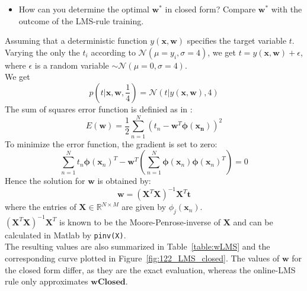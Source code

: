 \documentclass[a4]{article}
\begin{document}
\begin{itemize}
	\item How can you determine the optimal ${\mathbf w}^*$ in closed form? Compare ${\mathbf w}^*$ with the outcome of the LMS-rule training.
\end{itemize}
Assuming that a deterministic function $y(\mathbf{x}, \mathbf{w})$ specifies the target variable $t$. Varying the only the $t_i$ according to $\mathcal{N}(\mu = y_i,\sigma = 4)$, we get $t=y(\mathbf{x}, \mathbf{w}) + \epsilon$, where $\epsilon$ is a random variable $\sim \mathcal{N}(\mu = 0,\sigma = 4)$.\\
We get
$$p(t| \mathbf{x}, \mathbf{w}, \frac{1}{4}) = \mathcal{N}(t|y(\mathbf{x}, \mathbf{w}), 4)$$
The sum of squares error function is definied as in \cite{Bishop}:
$$E(\mathbf{w})=\frac{1}{2} \sum_{n=1} ^N (t_n- \mathbf{w}^T \mathbf{\phi}(\mathbf{x_n}))^2$$
To minimize the error function, the gradient is set to zero:
$$\sum_{n=1}^N t_n \mathbf{\phi}(\mathbf{x}_n)^T- \mathbf{w}^T \left( \sum_{n=1} ^N \mathbf{\phi} ( \mathbf{x}_n) \mathbf{\phi} ( \mathbf{x}_n)^T \right)=0$$
Hence the solution for $\mathbf{w}$ is obtained by:
$$ \mathbf{w}=(\mathbf{X}^T\mathbf{X})^{-1}\mathbf{X}^T\mathbf{t}$$
where the entries of $\mathbf{X} \in \mathbb{R}^{N \times M}$ are given by $\phi_j(\mathbf{x}_n)$. \\
$(\mathbf{X}^T\mathbf{X})^{-1}\mathbf{X}^T$ is known to be the Moore-Penrose-inverse of $\mathbf{X}$ and can be calculated in Matlab by \verb+pinv(X)+. \\

The resulting values are also summarized in Table~\ref{table:wLMS} and the corresponding curve plotted in Figure~\ref{fig:122_LMS_closed}. The values of $\mathbf{w}$ for the closed form differ, as they are the exact evaluation, whereas the online-LMS rule only approximates $\mathbf{wClosed}$.
\end{document}
